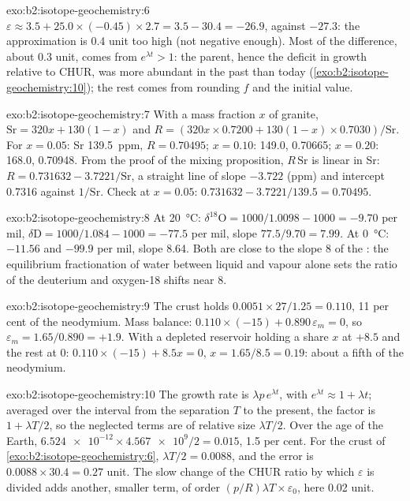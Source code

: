 \begin{solution}{exo:b2:isotope-geochemistry:6}
$\varepsilon \approx 3.5 + 25.0\times(-0.45)\times2.7 = 3.5 - 30.4 = -26.9$, against
$-27.3$: the approximation is 0.4 unit too high (not negative enough). Most of the
difference, about 0.3 unit, comes from $e^{\lambda t} > 1$: the parent, hence the
deficit in growth relative to CHUR, was more abundant in the past than today
(\cref{exo:b2:isotope-geochemistry:10}); the rest comes from rounding $f$ and the initial value.
\end{solution}

\begin{solution}{exo:b2:isotope-geochemistry:7}
With a mass fraction $x$ of granite, $\mathrm{Sr} = 320x + 130(1-x)$ and
$R = (320x\times0.7200 + 130(1-x)\times0.7030)/\mathrm{Sr}$. For $x = 0.05$: Sr
\qty{139.5}{ppm}, $R = 0.70495$; $x = 0.10$: 149.0, 0.70665; $x = 0.20$: 168.0,
0.70948. From the proof of the mixing proposition, $R\,\mathrm{Sr}$ is linear in Sr:
$R = 0.731632 - 3.7221/\mathrm{Sr}$, a straight line of slope $-3.722$ (ppm) and
intercept 0.7316 against $1/\mathrm{Sr}$. Check at $x = 0.05$: $0.731632 - 3.7221/139.5
= 0.70495$.
\end{solution}

\begin{solution}{exo:b2:isotope-geochemistry:8}
At \qty{20}{\degreeCelsius}: $\delta^{18}\mathrm{O} = 1000/1.0098 - 1000 = -9.70$ per
mil, $\delta\mathrm{D} = 1000/1.084 - 1000 = -77.5$ per mil, slope $77.5/9.70 = 7.99$.
At \qty{0}{\degreeCelsius}: $-11.56$ and $-99.9$ per mil, slope 8.64. Both are close to
the slope 8 of the : the equilibrium fractionation of water
between liquid and vapour alone sets the ratio of the deuterium and oxygen-18
shifts near 8.
\end{solution}

\begin{solution}{exo:b2:isotope-geochemistry:9}
The crust holds $0.0051\times27/1.25 = 0.110$, 11 per cent of the neodymium. Mass
balance: $0.110\times(-15) + 0.890\,\varepsilon_m = 0$, so $\varepsilon_m = 1.65/0.890 =
+1.9$. With a depleted reservoir holding a share $x$ at $+8.5$ and the rest at 0:
$0.110\times(-15) + 8.5x = 0$, $x = 1.65/8.5 = 0.19$: about a fifth of the
neodymium.
\end{solution}

\begin{solution}{exo:b2:isotope-geochemistry:10}
The growth rate is $\lambda p\,e^{\lambda t}$, with $e^{\lambda t} \approx 1 + \lambda t$;
averaged over the interval from the separation $T$ to the present, the factor is
$1 + \lambda T/2$, so the neglected terms are of relative size $\lambda T/2$. Over the
age of the Earth, $\num{6.524e-12}\times\num{4.567e9}/2 = 0.015$, 1.5 per cent. For the
crust of \cref{exo:b2:isotope-geochemistry:6}, $\lambda T/2 = 0.0088$, and the error is $0.0088\times30.4 = 0.27$
unit. The slow change of the CHUR ratio by which $\varepsilon$ is divided adds
another, smaller term, of order $(p/R)\lambda T \times \varepsilon_0$, here 0.02 unit.
\end{solution}

